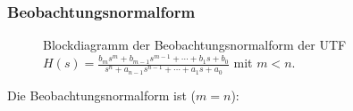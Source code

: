 \subsubsection{Beobachtungsnormalform}
\begin{figure}[!htb]
  \vspace*{-4mm}\begin{center}
    \vspace*{-3mm}\caption{Blockdiagramm der Beobachtungsnormalform der UTF $H(s)=\frac{b_{m} s^{m} + b_{m-1} s^{m-1} +\cdots+b_{1} s 
+ b_{0}}{s^{n} + a_{n-1} s^{n-1} + \cdots + a_{1} s + a_{0}}$ mit $m<n$.}
\end{center}
\vspace*{-6mm}
\end{figure}
\nit Die Beobachtungsnormalform ist ($m=n$): 
